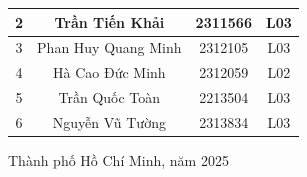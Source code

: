 \documentclass[a4paper]{article}
\begin{document}
\begin{titlepage}
\begin{center}
\begin{tabular}{|c|c|c|c|}
\hline 
{2} & {Trần Tiến Khải} & {2311566} & {L03}\\

\hline
{3} & {Phan Huy Quang Minh} & {2312105} & {L03} \\

\hline
{4} & {Hà Cao Đức Minh} & {2312059} & {L02} \\

\hline
{5} & {Trần Quốc Toàn} & {2213504} & {L03} \\

\hline
{6} & {Nguyễn Vũ Tường} & {2313834} & {L03} \\
\hline

\end{tabular}

\vfill
Thành phố Hồ Chí Minh, năm 2025

\end{center}
\end{titlepage}

\pagebreak
\tableofcontents
\pagebreak
















% 

% 
% 
\end{document}
